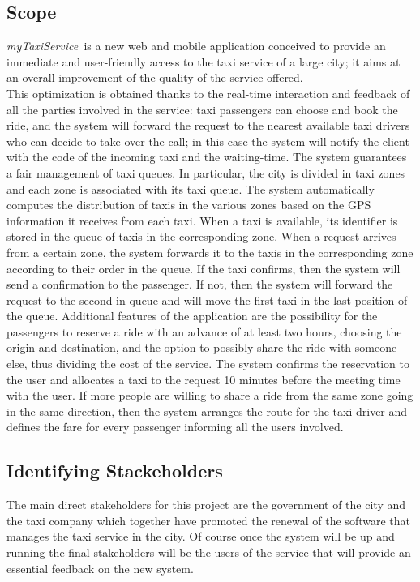 \documentclass[a4paper,11pt]{report} %
\newcommand{\mts}{\mbox{\normalfont\itshape myTaxiService\ }}
\begin{document}
	\subsection{Scope} \label{sec:scope}
	\mts is a new web and mobile application conceived to provide an immediate and user-friendly access to the taxi service of a large city; it aims at an overall improvement of the quality of the service offered.\\
	This optimization is obtained thanks to the real-time interaction and feedback of all the parties involved in the service: taxi passengers can choose and book the ride, and the system will forward the request to the nearest available taxi drivers who can decide to take over the call; in this case the system will notify the client with the code of the incoming taxi and the waiting-time.
	The	system	guarantees a fair management of taxi queues. In particular, the city is divided in taxi zones and each zone is associated with its taxi queue. The system automatically computes the distribution of taxis in the various zones based on the GPS information it receives from each taxi. When a taxi is available, its identifier is stored in the queue of taxis in the corresponding zone. When a request arrives from a certain zone, the system forwards it to the taxis in the corresponding zone according to their order in the queue. If the taxi confirms, then the system will send a confirmation to the passenger. If not, then the system will forward the request to the second in queue and will move the first taxi in the last position of the queue.
	Additional features of the application are the possibility for the passengers to reserve a ride with an advance of at least two hours, choosing the origin and destination, and the option to possibly share the ride with someone else, thus dividing the cost of the service. The system confirms the reservation to the user and allocates a taxi to the request 10 minutes before the meeting time with the user. If more people are willing to share a ride from the same zone going in the same direction, then the system arranges the route for the taxi driver and defines the fare for every passenger informing all the users involved. 
	
			
	\subsection{Identifying Stackeholders} The main direct stakeholders for this project are the government of the city and the taxi company which together have promoted the renewal of the software that manages the taxi service in the city. Of course once the system will be up and running the final stakeholders will be the users of the service that will provide an essential feedback on the new system.
	
\end{document}
